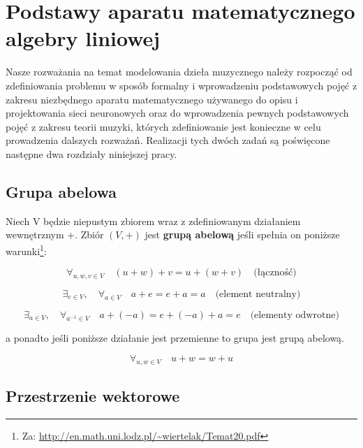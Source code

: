 \chapter{Podstawy aparatu matematycznego algebry liniowej}

Nasze rozważania na temat modelowania dzieła muzycznego należy rozpocząć od zdefiniowania problemu w sposób formalny i wprowadzeniu podstawowych pojęć z zakresu niezbędnego aparatu matematycznego używanego do opisu i projektowania sieci neuronowych oraz do wprowadzenia pewnych podstawowych pojęć z zakresu teorii muzyki, których zdefiniowanie jest konieczne w celu prowadzenia dalszych rozważań. Realizacji tych dwóch zadań są poświęcone następne dwa rozdziały niniejszej pracy.

\section{Grupa abelowa}
\begin{definicja}
Niech V będzie niepustym zbiorem wraz z zdefiniowanym działaniem wewnętrznym +. Zbiór $(V,+)$ jest \textbf{grupą abelową} jeśli spełnia on poniższe warunki\footnote{Za: \url{http://en.math.uni.lodz.pl/~wiertelak/Temat20.pdf}}:
\end{definicja}

\begin{equation*}
 \forall_{u,w,v \in V} \quad (u + w) + v = u + (w + v) \quad \text{(łączność)}
\end{equation*}

\begin{equation*}
 \exists_{e \in V}, \quad \forall_{a \in V} \quad a  + e = e + a = a \quad \text{(element neutralny)}
 \end{equation*}
 
 \begin{equation*}
     \exists_{a \in V}, \quad \forall_{a^{-1} \in V} \quad 
     a + (-a) = e + (-a) + a = e \quad \text{(elementy odwrotne)}
 \end{equation*}
 
 a ponadto jeśli poniższe działanie jest przemienne to grupa jest grupą abelową.
 
\begin{equation*}
    \forall_{u,w \in V} \quad u + w = w + u
\end{equation*}

\section{Przestrzenie wektorowe}

